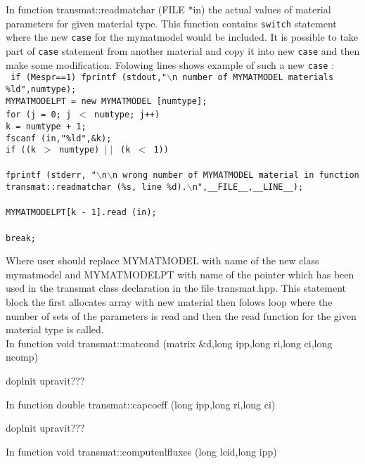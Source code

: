 In function {\sf transmat::readmatchar (FILE *in)} the actual values of material parameters for given material type. This function
contains {\tt switch} statement where the new {\tt case} for the  {\sf mymatmodel} would be included.
It is possible to take part of {\tt case} statement from another material and copy it into new {\tt case} and then
make some modification. Folowing lines shows example of such a new {\tt case} :\\
{\tt
      if (Mespr==1)  fprintf (stdout,"$\backslash$n number of MYMATMODEL materials \%ld",numtype);\\
      MYMATMODELPT = new MYMATMODEL [numtype];\\
      for (j = 0; j $<$ numtype; j++){\\
        k = numtype + 1;\\
        fscanf (in,"\%ld",\&k);\\
        if ((k $>$ numtype) $\mid\mid$ (k $<$ 1))\\
        {\\
          fprintf (stderr, "$\backslash$n$\backslash$n wrong number of MYMATMODEL material in function\\
                   transmat::readmatchar (\%s, line \%d).$\backslash$n",\_\_FILE\_\_,\_\_LINE\_\_);\\
        }\\
        MYMATMODELPT[k - 1].read (in);\\
      }\\
      break;\\
}

Where user should replace MYMATMODEL with name of the new class {\sf mymatmodel} and MYMATMODELPT with
name of the pointer which has been used in the {\sf transmat} class declaration in the file transmat.hpp. This
statement block the first allocates array with new material then folows loop where the number of sets of the
parameters is read and then the {\sf read} function for the given material type is called.\\

In function {\sf void transmat::matcond (matrix \&d,long ipp,long ri,long ci,long ncomp)}

doplnit upravit???


In function {\sf double transmat::capcoeff (long ipp,long ri,long ci)}


doplnit upravit???


In function {\sf void transmat::computenlfluxes (long lcid,long ipp)}


